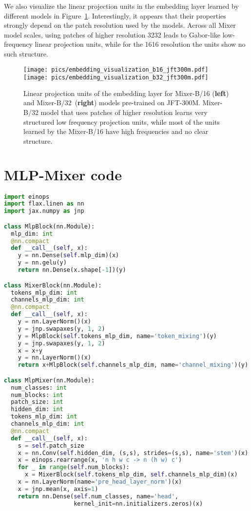 \documentclass{article}
\newcommand{\name}{Mixer}
\begin{document}
We also visualize the linear projection units in the embedding layer learned by different models in Figure~\ref{fig:embedding-plots}. 
Interestingly, it appears that their properties strongly depend on the patch resolution used by the models.
Across all \name{} model scales, using patches of higher resolution 3232 leads to Gabor-like low-frequency linear projection units, while for the 1616 resolution the units show no such structure.

\begin{figure}[t]
    \texttt{[image: pics/embedding\_visualization\_b16\_jft300m.pdf]}\hfill
    \texttt{[image: pics/embedding\_visualization\_b32\_jft300m.pdf]}
    \caption{Linear projection units of the embedding layer for \name{}-B/16 ({\bf left}) and \name{}-B/32~({\bf right}) models pre-trained on JFT-300M.
    \name{}-B/32 model that uses patches of higher resolution  learns very structured low frequency projection units, while most of the units learned by the \name{}-B/16 have high frequencies and no clear structure.
    }
  \label{fig:embedding-plots}
\end{figure}

\FloatBarrier

\section{MLP-Mixer code}
\label{sec:app:code}

\begin{lstlisting}[language=Python, caption=MLP-Mixer code written in JAX/Flax.]
import einops
import flax.linen as nn
import jax.numpy as jnp

class MlpBlock(nn.Module):
  mlp_dim: int
  @nn.compact
  def __call__(self, x):
    y = nn.Dense(self.mlp_dim)(x)
    y = nn.gelu(y)
    return nn.Dense(x.shape[-1])(y)

class MixerBlock(nn.Module):
  tokens_mlp_dim: int
  channels_mlp_dim: int
  @nn.compact
  def __call__(self, x):
    y = nn.LayerNorm()(x)
    y = jnp.swapaxes(y, 1, 2)
    y = MlpBlock(self.tokens_mlp_dim, name='token_mixing')(y)
    y = jnp.swapaxes(y, 1, 2)
    x = x+y
    y = nn.LayerNorm()(x)
    return x+MlpBlock(self.channels_mlp_dim, name='channel_mixing')(y)

class MlpMixer(nn.Module):
  num_classes: int
  num_blocks: int
  patch_size: int
  hidden_dim: int
  tokens_mlp_dim: int
  channels_mlp_dim: int
  @nn.compact
  def __call__(self, x):
    s = self.patch_size
    x = nn.Conv(self.hidden_dim, (s,s), strides=(s,s), name='stem')(x)
    x = einops.rearrange(x, 'n h w c -> n (h w) c')
    for _ in range(self.num_blocks):
      x = MixerBlock(self.tokens_mlp_dim, self.channels_mlp_dim)(x)
    x = nn.LayerNorm(name='pre_head_layer_norm')(x)
    x = jnp.mean(x, axis=1)
    return nn.Dense(self.num_classes, name='head',
                    kernel_init=nn.initializers.zeros)(x)

\end{lstlisting}
 
\end{document}

